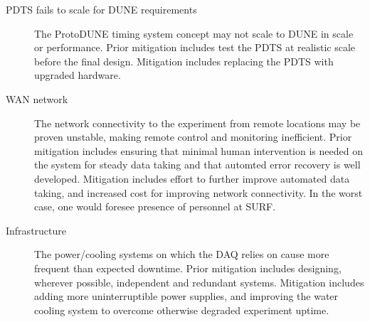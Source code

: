 \begin{description}


\item[PDTS fails to scale for DUNE requirements] The ProtoDUNE timing system concept may
  not scale to DUNE in scale or performance.  Prior mitigation
  includes test the PDTS at realistic scale before the final
  design. Mitigation includes replacing the PDTS with upgraded
  hardware.


\item[WAN network] The network connectivity to the experiment from
  remote locations may be proven unstable, making remote control and monitoring
  inefficient. Prior mitigation includes ensuring that minimal human intervention
  is needed on the system for steady data taking and that automted
  error recovery is well developed. Mitigation includes effort to further
  improve automated data taking, and increased cost for improving network
  connectivity. In the worst case, one would foresee presence of personnel at SURF.

\item[Infrastructure] The power/cooling systems on which the DAQ
  relies on cause more frequent than expected downtime. Prior
  mitigation includes designing, wherever possible, independent and redundant
  systems. Mitigation includes adding more uninterruptible power
  supplies, and improving the water cooling system to overcome otherwise
  degraded experiment uptime. 


\end{description}
